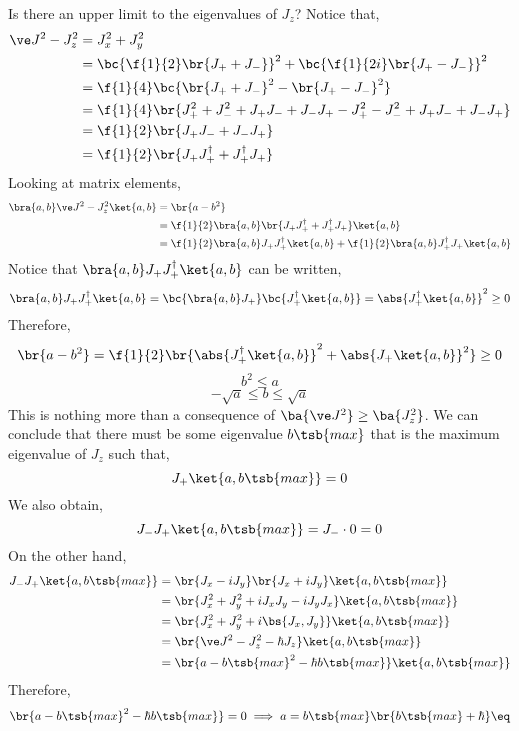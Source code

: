 \documentclass{article}
\begin{document}
Is there an upper limit to the eigenvalues of $J_z$? Notice that,
\begin{align*}
\ve J^2 - J_z^2
&= J_x^2 + J_y^2 \\
&= \bc{\f{1}{2} \br{J_+ + J_-}}^2 + \bc{\f{1}{2i} \br{J_+ - J_-}}^2 \\
&= \f{1}{4}\bc{\br{J_+ + J_-}^2 - \br{J_+ - J_-}^2} \\
&= \f{1}{4}\br{J_+^2 + J_-^2 + J_+J_- + J_-J_+ - J_+^2 - J_-^2 + J_+J_- + J_-J_+} \\
&= \f{1}{2}\br{J_+J_- + J_-J_+} \\
&= \f{1}{2}\br{J_+J_+^{\dagger} + J_+^{\dagger}J_+}
\end{align*}
Looking at matrix elements,
\begin{align*}
    \bra{a,b} \ve J^2 - J_z^2 \ket{a,b}
    &= \br{a - b^2} \\
    &= \f{1}{2}\bra{a,b}\br{J_+J_+^{\dagger} + J_+^{\dagger}J_+}\ket{a,b} \\
    &= \f{1}{2}\bra{a,b}J_+J_+^{\dagger}\ket{a,b} + \f{1}{2}\bra{a,b}J_+^{\dagger}J_+\ket{a,b} \\
\end{align*}
Notice that $\bra{a,b}J_+J_+^{\dagger}\ket{a,b}$ can be written,
\[ \bra{a,b}J_+J_+^{\dagger}\ket{a,b} = \bc{\bra{a,b}J_+}\bc{J_+^{\dagger}\ket{a,b}} = \abs{J_+^{\dagger}\ket{a,b}}^2 \geq 0 \]
Therefore,
\[ \br{a - b^2} = \f{1}{2} \br{\abs{J_+^{\dagger}\ket{a,b}}^2 + \abs{J_+\ket{a,b}}^2} \geq 0 \]
\[ b^2 \leq a \]
\[ - \sqrt{a} \leq b \leq \sqrt{a} \]
This is nothing more than a consequence of $\ba{\ve J^2} \geq \ba{J_z^2}$. We can conclude that there must be some eigenvalue $b\tsb{max}$ that is the maximum eigenvalue of $J_z$ such that,
\[ J_+ \ket{a, b\tsb{max}} = 0 \]
We also obtain,
\[ J_-J_+ \ket{a, b\tsb{max}} = J_- \cdot 0 = 0 \]
On the other hand,
\begin{align*}
    J_-J_+ \ket{a, b\tsb{max}}
    &= \br{J_x - i J_y}\br{J_x + i J_y} \ket{a, b\tsb{max}} \\
    &= \br{J_x^2 + J_y^2 + i J_x J_y- i J_y J_x} \ket{a, b\tsb{max}} \\
    &= \br{J_x^2 + J_y^2 + i \bs{J_x, J_y}} \ket{a, b\tsb{max}} \\
    &= \br{\ve J^2 - J_z^2 - \hbar J_z} \ket{a, b\tsb{max}} \\
    &= \br{a - b\tsb{max}^2 - \hbar b\tsb{max}} \ket{a, b\tsb{max}}
\end{align*}
Therefore,
\[ \br{a - b\tsb{max}^2 - \hbar b\tsb{max}} = 0 \implies a = b\tsb{max}\br{b\tsb{max} + \hbar} \eq \label{eq:bmax}\]
\end{document}
